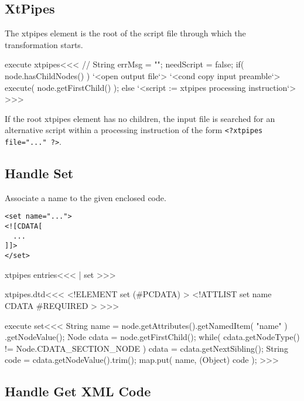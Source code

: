 \documentclass{article}
\begin{document}
{%
\subsection{XtPipes}

The xtpipes element is the root of the script file through which 
the transformation starts.

\<execute xtpipes\><<<
// String errMsg = "";
needScript = false;
if( node.hasChildNodes() ){
  `<open output file`>
  `<cond copy input preamble`>
   execute( node.getFirstChild() );
} else {
   `<script := xtpipes processing instruction`>
}  
>>>






If the root xtpipes element has no children, the input file is
searched for an alternative script within a processing instruction of
the form \verb+<?xtpipes file="..." ?>+.





\subsection{Handle Set}

Associate a name to the given enclosed  code.

\begin{verbatim}
<set name="...">  
<![CDATA[  
  ...  
]]>  
</set>
\end{verbatim}

\<xtpipes entries\><<<
| set
>>>

\<xtpipes.dtd\><<<
<!ELEMENT set (#PCDATA) >  
<!ATTLIST set
          name CDATA #REQUIRED >
>>>





\<execute set\><<<
String name = node.getAttributes().getNamedItem( "name" )
                                  .getNodeValue();
Node cdata = node.getFirstChild();
while( cdata.getNodeType() != Node.CDATA_SECTION_NODE ){
   cdata = cdata.getNextSibling();
}
String code = cdata.getNodeValue().trim();
map.put( name, (Object) code );
>>>









\subsection{Handle Get XML Code}

}
\end{document}
